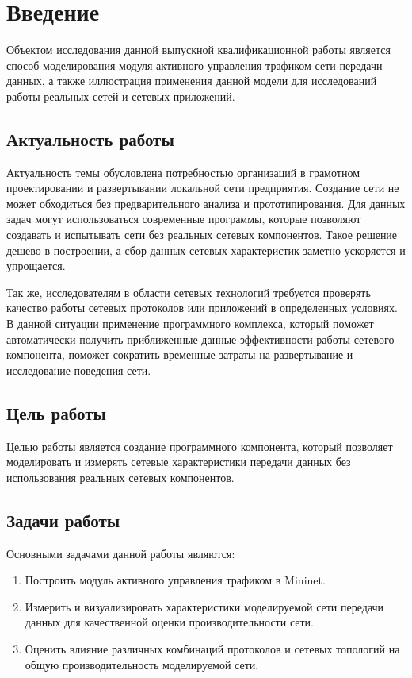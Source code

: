\chapter*{Введение}

Объектом исследования данной выпускной квалификационной работы является
способ моделирования модуля активного управления трафиком сети передачи
данных, а также иллюстрация применения данной модели для исследований
работы реальных сетей и сетевых приложений.

\section*{Актуальность работы}

Актуальность темы обусловлена потребностью организаций в грамотном
проектировании и развертывании локальной сети предприятия. Создание сети
не может обходиться без предварительного анализа и прототипирования. Для
данных задач могут использоваться современные программы, которые
позволяют создавать и испытывать сети без реальных сетевых компонентов.
Такое решение дешево в построении, а сбор данных сетевых характеристик
заметно ускоряется и упрощается.

Так же, исследователям в области сетевых технологий требуется проверять
качество работы сетевых протоколов или приложений в определенных
условиях. В данной ситуации применение программного комплекса, который
поможет автоматически получить приближенные данные эффективности работы
сетевого компонента, поможет сократить временные затраты на
развертывание и исследование поведения сети.


\section*{Цель работы}

Целью работы является создание программного компонента, который
позволяет моделировать и измерять сетевые характеристики передачи данных
без использования реальных сетевых компонентов.

\section*{Задачи работы}

Основными задачами данной работы являются:

\begin{enumerate}
\item Построить модуль активного управления трафиком в Mininet.
\item Измерить и визуализировать характеристики моделируемой сети
  передачи данных для качественной оценки производительности сети.
\item Оценить влияние различных комбинаций протоколов и сетевых
  топологий на общую производительность моделируемой сети.
\end{enumerate}

